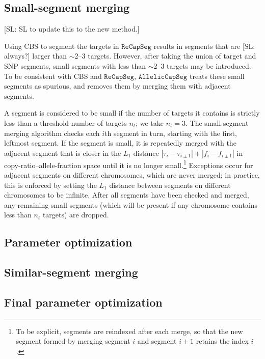 \documentclass[nofootinbib,amssymb,amsmath]{revtex4}
\newcommand{\RCS}{\texttt{ReCapSeg}}
\newcommand{\ACS}{\texttt{AllelicCapSeg}}
\def\SL#1{{\color [rgb]{0,0,0.8} [SL: #1]}}
\begin{document}
\subsection{Small-segment merging} \label{small-segment-merging}

\SL{SL to update this to the new method.}

Using CBS to segment the targets in $\RCS$ results in segments that are \SL{always?} larger than $\sim$2--3 targets.  However, after taking the union of target and SNP segments, small segments with less than $\sim$2--3 targets may be introduced.  To be consistent with CBS and $\RCS$, $\ACS$ treats these small segments as spurious, and removes them by merging them with adjacent segments.

A segment is considered to be small if the number of targets it contains is strictly less than a threshold number of targets $n_t$; we take $n_t = 3$.  The small-segment merging algorithm checks each $i$th segment in turn, starting with the first, leftmost segment.  If the segment is small, it is repeatedly merged with the adjacent segment that is closer in the $L_1$ distance $|\tau_i - \tau_{i \pm 1}| + |f_i - f_{i \pm 1}|$ in copy-ratio--allele-fraction space until it is no longer small.\footnote{To be explicit, segments are reindexed after each merge, so that the new segment formed by merging segment $i$ and segment $i \pm 1$ retains the index $i$.}  Exceptions occur for adjacent segments on different chromosomes, which are never merged; in practice, this is enforced by setting the $L_1$ distance between segments on different chromosomes to be infinite.  After all segments have been checked and merged, any remaining small segments (which will be present if any chromosome contains less than $n_t$ targets) are dropped.

\subsection{Parameter optimization}\label{parameter-optimization}

\subsection{Similar-segment merging} \label{similar-segment-merging}

\subsection{Final parameter optimization} \label{final-parameter-optimization}
\end{document}
